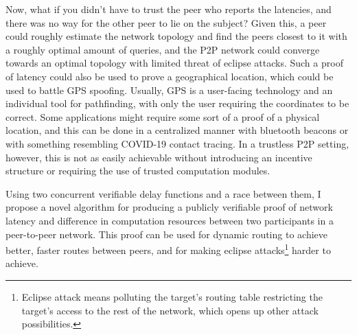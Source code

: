 Now, what if you didn't have to trust the peer who reports the latencies, and there was no way for the other peer to lie on the subject? Given this, a peer could roughly estimate the network topology and find the peers closest to it with a roughly optimal amount of queries, and the P2P network could converge towards an optimal topology with limited threat of eclipse attacks. Such a proof of latency could also be used to prove a geographical location, which could be used to battle GPS spoofing. Usually, GPS is a user-facing technology and an individual tool for pathfinding, with only the user requiring the coordinates to be correct. Some applications might require some sort of a proof of a physical location, and this can be done in a centralized manner with bluetooth beacons or with something resembling COVID-19 contact tracing. In a trustless P2P setting, however, this is not as easily achievable without introducing an incentive structure or requiring the use of trusted computation modules.  

Using two concurrent verifiable delay functions and a race between them, I propose a novel algorithm for producing a publicly verifiable proof of network latency and difference in computation resources between two participants in a peer-to-peer network. This proof can be used for dynamic routing to achieve better, faster routes between peers, and for making eclipse attacks\footnote{Eclipse attack means polluting the target's routing table restricting the target's access to the rest of the network, which opens up other attack possibilities.} harder to achieve. 
